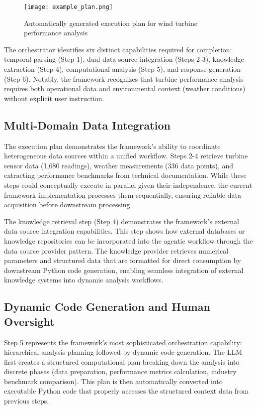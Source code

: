\begin{figure}[h]
    \centering
    \texttt{[image: example\_plan.png]}
    \caption{Automatically generated execution plan for wind turbine performance analysis}
    \label{fig:wind-turbine-execution-plan}
\end{figure}


The orchestrator identifies six distinct capabilities required for completion: temporal parsing (Step 1), dual data source integration (Steps 2-3), knowledge extraction (Step 4), computational analysis (Step 5), and response generation (Step 6). Notably, the framework recognizes that turbine performance analysis requires both operational data and environmental context (weather conditions) without explicit user instruction.

\subsection{Multi-Domain Data Integration}

The execution plan demonstrates the framework's ability to coordinate heterogeneous data sources within a unified workflow. Steps 2-4 retrieve turbine sensor data (1,680 readings), weather measurements (336 data points), and extracting performance benchmarks from technical documentation. While these steps could conceptually execute in parallel given their independence, the current framework implementation processes them sequentially, ensuring reliable data acquisition before downstream processing.

The knowledge retrieval step (Step 4) demonstrates the framework's external data source integration capabilities. This step shows how external databases or knowledge repositories can be incorporated into the agentic workflow through the data source provider pattern. The knowledge provider retrieves numerical parameters and structured data that are formatted for direct consumption by downstream Python code generation, enabling seamless integration of external knowledge systems into dynamic analysis workflows.

\subsection{Dynamic Code Generation and Human Oversight}

Step 5 represents the framework's most sophisticated orchestration capability: hierarchical analysis planning followed by dynamic code generation. The LLM first creates a structured computational plan breaking down the analysis into discrete phases (data preparation, performance metrics calculation, industry benchmark comparison). This plan is then automatically converted into executable Python code that properly accesses the structured context data from previous steps.

